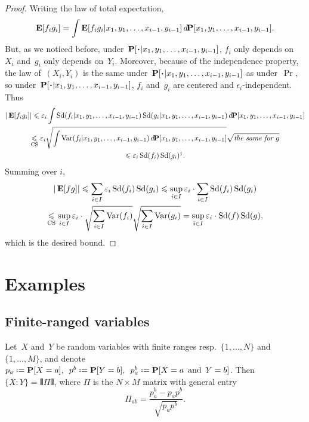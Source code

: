 \begin{proof}
Writing the law of total expectation,
\[ \EE[f_ig_i] = \int \EE[f_ig_i|x_1,y_1,\ldots,x_{i-1},y_{i-1}]
\, \dx\Pr[x_1,y_1,\ldots,x_{i-1},y_{i-1}] .\]
But, as we noticed before,
under~$\Pr[\Bcdot|\ab x_1,y_1,\ldots,x_{i-1},y_{i-1}]$,
$f_i$ only depends on~$X_i$ and~$g_i$ only depends on~$Y_i$.
Moreover, because of the independence property,
the law of~$(X_i,Y_i)$ is the same
under~$\Pr[\Bcdot|\ab x_1,y_1,\ldots,x_{i-1},y_{i-1}]$ as under~$\Pr$,
so under~$\Pr[\Bcdot|\ab x_1,y_1,\ldots,x_{i-1},y_{i-1}]$, $f_i$ and~$g_i$ are centered and $\epsilon_i$-independent.
Thus
\begin{multline}
|\EE[f_ig_i]| \leq
\epsilon_i \int \ecty(f_i|x_1,y_1,\ldots,x_{i-1},y_{i-1}) \ecty(g_i|x_1,y_1,\ldots,x_{i-1},y_{i-1})
\,\dx\Pr[x_1,y_1,\ldots,x_{i-1},y_{i-1}] \\
\footrel{\text{CS}}{\leq} \epsilon_i \sqrt{\int \Var(f_i|x_1,y_1,\ldots,x_{i-1},y_{i-1}) \,\dx\Pr[x_1,y_1,\ldots,x_{i-1},y_{i-1}]}
\sqrt{\textit{the same for~$g$}} \\
\leq \epsilon_i \ecty(f_i)\ecty(g_i) \footnotemark.
\end{multline}
Summing over $i$,
\begin{multline} |\mathop{\smash{\mathbf{E}}}\nolimits[fg]| \leqslant \sum_{i\in I} \varepsilon_i \operatorname{Sd}(f_i)\operatorname{Sd}(g_i)
\leqslant \sup_{i\in I} \varepsilon_i \cdot \sum_{i\in I} \operatorname{Sd}(f_i)\operatorname{Sd}(g_i) \\
\underset{\text{CS}}{\leqslant} \sup_{i\in I} \varepsilon_i \cdot \sqrt{\sum_{i\in I}\operatorname{Var}(f_i)} \sqrt{\sum_{i\in I}\operatorname{Var}(g_i)}
= \sup_{i\in I} \varepsilon_i \cdot \operatorname{Sd}(f) \operatorname{Sd}(g),
\end{multline}
which is the desired bound.
\end{proof}



\section{Examples}\label{parExamples}

\subsection{Finite-ranged variables}

\begin{Pro}\label{pro3798}
Let~$X$ and~$Y$ be random variables with finite ranges
resp.~$\{1,\ldots,N\}$ and~$\{1,\ldots,M\}$,
and denote $p_a \coloneqq \Pr[X=a], \enskip p^b \coloneqq {\Pr[Y=b]}, \enskip p_a^b \coloneqq \Pr[{X=a} \enskip \text{and} \enskip Y=b]$.
Then ${\{X:Y\}} = \VERT \Pi \VERT$, where $\Pi$ is the $N\times M$ matrix with general entry
\[\label{for7497} \Pi_{ab} = \frac{p_a^b-p_ap^b}{\sqrt{p_ap^b}} .\]
\end{Pro}

